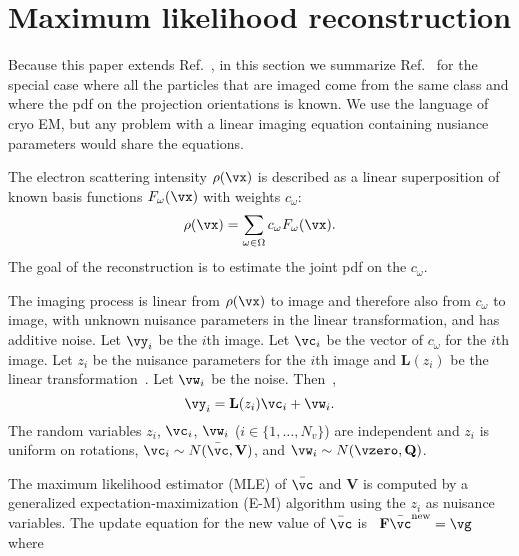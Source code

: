 \section{Maximum likelihood reconstruction}
\label{sec:MLreconstruction}
Because this paper extends Ref.~\cite{YiliZhengQiuWangDoerschukJOSA2012},
in this section we summarize Ref.~\cite{YiliZhengQiuWangDoerschukJOSA2012}
for the special case where all the particles that are imaged come from the
same class and where the pdf on the projection orientations is known.
We use the language of cryo EM, but any problem with a linear imaging
equation containing nusiance parameters would share the equations.
\par
The electron scattering intensity $\rho(\vx)$ is described as a linear
superposition of known basis functions $F_\omega(\vx)$ with weights
$c_\omega$:
\begin{equation}
\rho(\vx)
=
\sum_{\omega\in\Omega}
c_\omega
F_\omega(\vx)
\label{eq:rho:general}
.
\end{equation}
The goal of the reconstruction is to estimate the joint pdf on the
$c_\omega$.
\par
The imaging process is linear from $\rho(\vx)$ to image and therefore also
from $c_\omega$ to image, with unknown nuisance parameters in the linear
transformation, and has additive noise.
Let $\vy_i$ be the $i$th image.
Let $\vc_i$ be the vector of $c_\omega$ for the $i$th image.
Let $z_i$ be the nuisance parameters for the $i$th image and
$\mathbf{L}(z_i)$ be the linear
transformation~\cite{Erickson1973,LepaultPitt1984,ToyoshimaUnwin1988,Scherzer1949}.
Let $\vw_i$ be the noise.
Then~\cite[Eq.~3]{YiliZhengQiuWangDoerschukJOSA2012},
\begin{equation}
\vy_i=\mathbf{L}(z_i)\vc_i+\vw_i
.
\label{eq:2Dmodel}
\end{equation}
The random variables $z_i$, $\vc_i$, $\vw_i$ ($i\in\{1,\dots,N_v\}$) are
independent and
$z_i$ is uniform on rotations,
$\vc_i\sim N(\bar{\vc},\mathbf{V})$, and
$\vw_i\sim N(\vzero,\mathbf{Q})$.
\par
The maximum likelihood estimator (MLE) of $\bar{\vc}$ and $\mathbf{V}$ is
computed by a generalized expectation-maximization (E-M)
algorithm
using the $z_i$ as nuisance variables.
The update equation for the new value of $\bar{\vc}$
is~\cite[Eq.~33]{YiliZhengQiuWangDoerschukJOSA2012}
$\mathbf{F} \bar{\vc}^{\rm new}=\vg$ where

